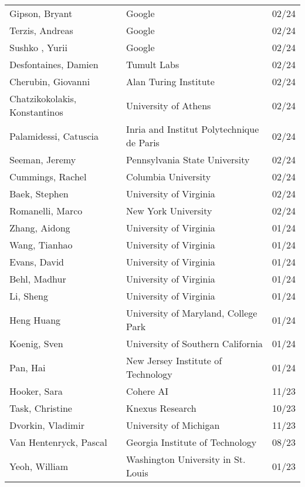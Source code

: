 \documentclass[localFont,alternative]{documentMETADATA}
\begin{document}
\begin{tabular}{lll}
	 Gipson, Bryant & Google 	& 02/24\\
	 Terzis, Andreas & Google  	& 02/24\\
	 Sushko , Yurii & Google  	& 02/24\\
	 Desfontaines, Damien & Tumult Labs  	& 02/24\\
	 Cherubin, Giovanni & Alan Turing Institute 	& 02/24\\
	 Chatzikokolakis, Konstantinos & University of Athens 	& 02/24\\
	 Palamidessi, Catuscia & Inria and Institut Polytechnique de Paris 	& 02/24\\
	 Seeman, Jeremy & Pennsylvania State University 	& 02/24\\
    Cummings, Rachel & Columbia University 	& 02/24\\
		Baek, Stephen						& University of Virginia						  & 02/24 \\
		Romanelli, Marco 			 	& New York University							 		& 02/24 \\
		Zhang, Aidong						& University of Virginia						  & 01/24 \\
		Wang, Tianhao						& University of Virginia						  & 01/24 \\
		Evans, David						& University of Virginia						  & 01/24 \\
		Behl, Madhur						& University of Virginia						  & 01/24 \\
		Li, Sheng 							& University of Virginia						  & 01/24 \\
		Heng Huang 							& University of Maryland, College Park& 01/24 \\
		Koenig, Sven 						& University of Southern California 	& 01/24 \\
		Pan, Hai 								& New Jersey Institute of Technology 	& 01/24 \\
		Hooker, Sara            & Cohere AI                           & 11/23 \\
		Task, Christine					& Knexus Research										 	& 10/23 \\
		Dvorkin, Vladimir 			& University of Michigan  						& 11/23 \\
		Van Hentenryck, Pascal 	& Georgia Institute of Technology 		& 08/23 \\
		Yeoh, William 				 	& Washington University in St. Louis 	& 01/23 \\
\bottomrule
\end{tabular}
\end{document}
